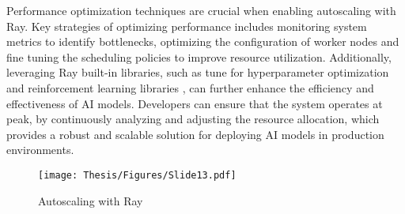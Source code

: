 Performance optimization techniques are crucial when enabling autoscaling with Ray. Key strategies of optimizing performance includes monitoring system metrics to identify bottlenecks, optimizing the configuration of worker nodes and fine tuning the scheduling policies to improve resource utilization. Additionally, leveraging Ray built-in libraries, such as tune for hyperparameter optimization and reinforcement learning libraries , can further enhance the efficiency and effectiveness of AI models. Developers can ensure that the system operates at peak, by continuously analyzing and adjusting the resource allocation, which provides a robust and scalable solution for deploying AI models in production environments. \cite{r52}

\makeatletter
\setlength{\@fptop}{0pt}
\makeatother


\begin{figure}[h]
\centering
\texttt{[image: Thesis/Figures/Slide13.pdf]}
\caption{\label{fig:Autoscaling with Ray}Autoscaling with Ray \cite{ray_doc}}
\end{figure}
